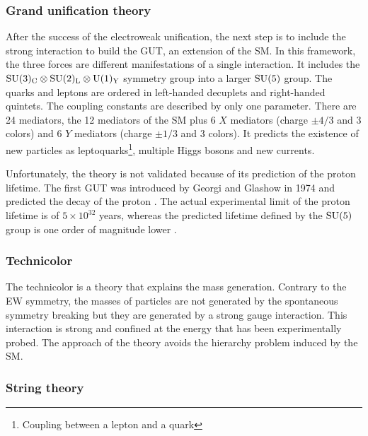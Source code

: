       \subsubsection{Grand unification theory}
      
      After the success of the electroweak unification, the next step is to include the strong interaction to build the \gls{GUT}, an extension of the \gls{SM}.
      In this framework, the three forces are different manifestations of a single interaction. 
      It includes the $\rm{SU}(3)_{\rm{C}} \otimes \rm{SU}(2)_{\rm{L}} \otimes \rm{U}(1)_{\rm{Y}}$ symmetry group into a larger $\rm{SU}(5)$ group. 
      The quarks and leptons are ordered in left-handed decuplets and right-handed quintets.
      The coupling constants are described by only one parameter.  
      There are 24 mediators, the 12 mediators of the \gls{SM} plus 6 $X$ mediators (charge $\pm4/3$ and 3 colors) and 6 $Y$ mediators (charge $\pm1/3$ and 3 colors).
      It predicts the existence of new particles as leptoquarks\footnote{Coupling between a lepton and a quark}, multiple Higgs bosons and new currents.

      Unfortunately, the theory is not validated because of its prediction of the proton lifetime. 
      The first \gls{GUT} was introduced by Georgi and Glashow in 1974 and predicted the decay of the proton \cite{Georgi:1974sy}. 
      The actual experimental limit of the proton lifetime is of $5 \times 10^{32}$ years, whereas the predicted lifetime defined by the $\rm{SU}(5)$ group is one order of magnitude lower \cite{Agashe:2014kda}.

      \subsubsection{Technicolor}

      The technicolor is a theory that explains the mass generation.
      Contrary to the \gls{EW} symmetry, the masses of particles are not generated by the spontaneous symmetry breaking but they are generated by a strong gauge interaction.
      This interaction is strong and confined at the energy that has been experimentally probed.
      The approach of the theory avoids the hierarchy problem induced by the \gls{SM}.
      
      \subsubsection{String theory}


